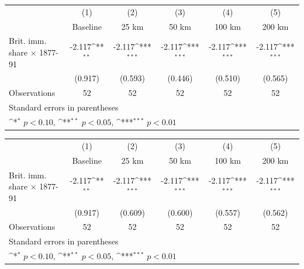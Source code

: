 {
\def\sym#1{\ifmmode^{#1}\else\(^{#1}\)\fi}
\begin{tabular}{l*{5}{c}}
\hline\hline
                    &\multicolumn{1}{c}{(1)}&\multicolumn{1}{c}{(2)}&\multicolumn{1}{c}{(3)}&\multicolumn{1}{c}{(4)}&\multicolumn{1}{c}{(5)}\\
                    &\multicolumn{1}{c}{Baseline}&\multicolumn{1}{c}{25 km}&\multicolumn{1}{c}{50 km}&\multicolumn{1}{c}{100 km}&\multicolumn{1}{c}{200 km}\\
\hline
Brit. imm. share $\times$ 1877-91&      -2.117\sym{**} &      -2.117\sym{***}&      -2.117\sym{***}&      -2.117\sym{***}&      -2.117\sym{***}\\
                    &     (0.917)         &     (0.593)         &     (0.446)         &     (0.510)         &     (0.565)         \\
\hline
Observations        &          52         &          52         &          52         &          52         &          52         \\
\hline\hline
\multicolumn{6}{l}{\footnotesize Standard errors in parentheses}\\
\multicolumn{6}{l}{\footnotesize \sym{*} \(p<0.10\), \sym{**} \(p<0.05\), \sym{***} \(p<0.01\)}\\
\end{tabular}
}
{
\def\sym#1{\ifmmode^{#1}\else\(^{#1}\)\fi}
\begin{tabular}{l*{5}{c}}
\hline\hline
                    &\multicolumn{1}{c}{(1)}&\multicolumn{1}{c}{(2)}&\multicolumn{1}{c}{(3)}&\multicolumn{1}{c}{(4)}&\multicolumn{1}{c}{(5)}\\
                    &\multicolumn{1}{c}{Baseline}&\multicolumn{1}{c}{25 km}&\multicolumn{1}{c}{50 km}&\multicolumn{1}{c}{100 km}&\multicolumn{1}{c}{200 km}\\
\hline
Brit. imm. share $\times$ 1877-91&      -2.117\sym{**} &      -2.117\sym{***}&      -2.117\sym{***}&      -2.117\sym{***}&      -2.117\sym{***}\\
                    &     (0.917)         &     (0.609)         &     (0.600)         &     (0.557)         &     (0.562)         \\
\hline
Observations        &          52         &          52         &          52         &          52         &          52         \\
\hline\hline
\multicolumn{6}{l}{\footnotesize Standard errors in parentheses}\\
\multicolumn{6}{l}{\footnotesize \sym{*} \(p<0.10\), \sym{**} \(p<0.05\), \sym{***} \(p<0.01\)}\\
\end{tabular}
}
